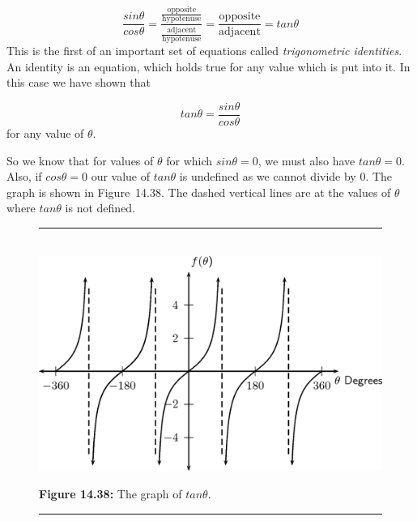     \begin{equation}
    \frac{sin\theta }{cos\theta }=\frac{\frac{\mathrm{opposite}}{\mathrm{hypotenuse}}}{\frac{\mathrm{adjacent}}{\mathrm{hypotenuse}}}=\frac{\mathrm{opposite}}{\mathrm{adjacent}}=tan\theta \tag{14.36}
      \end{equation}
        \label{m39414*id89965}This is the first of an important set of equations called \textsl{trigonometric identities}. An identity is an equation, which holds true for any value which is put into it. In this case we have shown that\par 
        \label{m39414*id89978}\nopagebreak\noindent{}
          
    \begin{equation}
    tan\theta =\frac{sin\theta }{cos\theta }\tag{14.37}
      \end{equation}
        \label{m39414*id90014}for any value of $\theta $.\par 
        \label{m39414*id90030}So we know that for values of $\theta $ for which $sin\theta =0$, we must also have $tan\theta =0$. Also, if $cos\theta =0$ our value of $tan\theta $ is undefined as we cannot divide by 0. The graph is shown in Figure~14.38. The dashed vertical lines are at the values of $\theta $ where $tan\theta $ is not defined.\par 
    \setcounter{subfigure}{0}
	\begin{figure}[H] %
    \begin{center}
    \rule[.1in]{\figurerulewidth}{.005in} \\
        \label{m39414*uid71!!!underscore!!!media}\label{m39414*uid71!!!underscore!!!printimage}\includegraphics{col11306.imgs/m39414_MG10C15_044.png} %
      \vspace{2pt}
    \vspace{\rubberspace}\par \begin{cnxcaption}
	  \small \textbf{Figure 14.38: }The graph of $tan\theta $.
	\end{cnxcaption}
    \vspace{.1in}
    \rule[.1in]{\figurerulewidth}{.005in} \\
    \end{center}
 \end{figure}       
